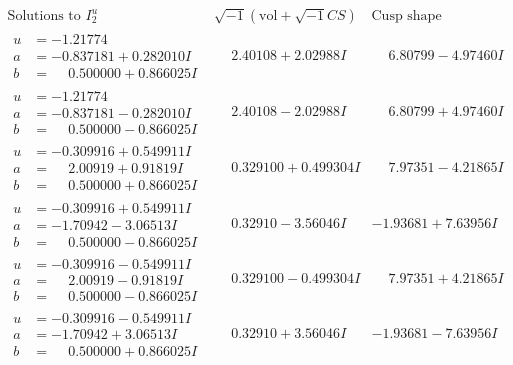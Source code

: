 \documentclass[1p]{elsarticle_modified}
\theoremstyle{definition}
\newcommand{\I}{\sqrt{-1}}
\begin{document}
$$\begin{array}{c|c|c}  
\text{Solutions to }I^u_{2}& \I (\text{vol} + \sqrt{-1}CS) & \text{Cusp shape}\\
 \hline 
\begin{aligned}
u &= -1.21774\phantom{ +0.000000I} \\
a &= -0.837181 + 0.282010 I \\
b &= \phantom{-}0.500000 + 0.866025 I\end{aligned}
 & \phantom{-}2.40108 + 2.02988 I & \phantom{-}6.80799 - 4.97460 I \\ \hline\begin{aligned}
u &= -1.21774\phantom{ +0.000000I} \\
a &= -0.837181 - 0.282010 I \\
b &= \phantom{-}0.500000 - 0.866025 I\end{aligned}
 & \phantom{-}2.40108 - 2.02988 I & \phantom{-}6.80799 + 4.97460 I \\ \hline\begin{aligned}
u &= -0.309916 + 0.549911 I \\
a &= \phantom{-}2.00919 + 0.91819 I \\
b &= \phantom{-}0.500000 + 0.866025 I\end{aligned}
 & \phantom{-}0.329100 + 0.499304 I & \phantom{-}7.97351 - 4.21865 I \\ \hline\begin{aligned}
u &= -0.309916 + 0.549911 I \\
a &= -1.70942 - 3.06513 I \\
b &= \phantom{-}0.500000 - 0.866025 I\end{aligned}
 & \phantom{-}0.32910 - 3.56046 I & -1.93681 + 7.63956 I \\ \hline\begin{aligned}
u &= -0.309916 - 0.549911 I \\
a &= \phantom{-}2.00919 - 0.91819 I \\
b &= \phantom{-}0.500000 - 0.866025 I\end{aligned}
 & \phantom{-}0.329100 - 0.499304 I & \phantom{-}7.97351 + 4.21865 I \\ \hline\begin{aligned}
u &= -0.309916 - 0.549911 I \\
a &= -1.70942 + 3.06513 I \\
b &= \phantom{-}0.500000 + 0.866025 I\end{aligned}
 & \phantom{-}0.32910 + 3.56046 I & -1.93681 - 7.63956 I \\ \hline\begin{aligned}

\end{aligned}
\end{array}$$
\end{document}
